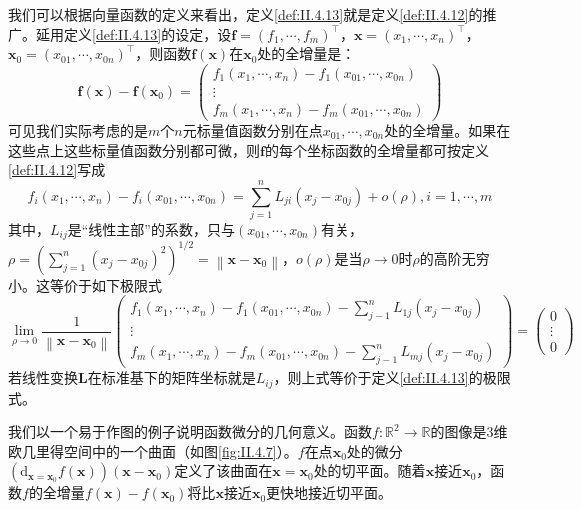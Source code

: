 \documentclass[main.tex]{subfiles}
\begin{document}
我们可以根据向量函数的定义来看出，定义\ref{def:II.4.13}就是定义\ref{def:II.4.12}的推广。延用定义\ref{def:II.4.13}的设定，设$\mathbf{f}=\left(f_1,\cdots,f_m\right)^\intercal$，$\mathbf{x}=\left(x_1,\cdots,x_n\right)^\intercal$，$\mathbf{x}_0=\left(x_{01},\cdots,x_{0n}\right)^\intercal$，则函数$\mathbf{f}\left(\mathbf{x}\right)$在$\mathbf{x}_0$处的全增量是：
\[
    \mathbf{f}\left(\mathbf{x}\right)-\mathbf{f}\left(\mathbf{x}_0\right)=\left(
    \begin{array}{c}
            f_1\left(x_1,\cdots,x_n\right)-f_1\left(x_{01},\cdots,x_{0n}\right) \\
            \vdots                                                              \\
            f_m\left(x_1,\cdots,x_n\right)-f_m\left(x_{01},\cdots,x_{0n}\right)
        \end{array}\right)
\]
可见我们实际考虑的是$m$个$n$元标量值函数分别在点$x_{01},\cdots,x_{0n}$处的全增量。如果在这些点上这些标量值函数分别都可微，则$\mathbf{f}$的每个坐标函数的全增量都可按定义\ref{def:II.4.12}写成
\[
    f_i\left(x_1,\cdots,x_n\right)-f_i\left(x_{01},\cdots,x_{0n}\right)=\sum_{j=1}^n L_{ji}\left(x_j-x_{0j}\right)+o\left(\rho\right),i=1,\cdots,m
\]
其中，$L_{ij}$是“线性主部”的系数，只与$\left(x_{01},\cdots,x_{0n}\right)$有关，$\rho=\left(\sum_{j=1}^n\left(x_j-x_{0j}\right)^2\right)^{1/2}=\left\|\mathbf{x}-\mathbf{x}_0\right\|$，$o\left(\rho\right)$是当$\rho\to 0$时$\rho$的高阶无穷小。这等价于如下极限式
\[
    \lim_{\rho\to 0}\frac{1}{\left\|\mathbf{x}-\mathbf{x}_0\right\|}\left(\begin{array}{c}
            f_1\left(x_1,\cdots,x_n\right)-f_1\left(x_{01},\cdots,x_{0n}\right)-\sum_{j-1}^nL_{1j}\left(x_j-x_{0j}\right) \\
            \vdots                                                                                                        \\
            f_m\left(x_1,\cdots,x_n\right)-f_m\left(x_{01},\cdots,x_{0n}\right)-\sum_{j-1}^nL_{mj}\left(x_j-x_{0j}\right)
        \end{array}\right)=\left(\begin{array}{c}0\\\vdots\\0\end{array}\right)
\]
若线性变换$\mathbf{L}$在标准基下的矩阵坐标就是$L_{ij}$，则上式等价于定义\ref{def:II.4.13}的极限式。

我们以一个易于作图的例子说明函数微分的几何意义。函数$f:\mathbb{R}^2\rightarrow\mathbb{R}$的图像是3维欧几里得空间中的一个曲面（如图\ref{fig:II.4.7}）。$f$在点$\mathbf{x}_0$处的微分$\left(\mathrm{d}_{\mathbf{x}=\mathbf{x}_0}f\left(\mathbf{x}\right)\right)\left(\mathbf{x}-\mathbf{x}_0\right)$定义了该曲面在$\mathbf{x}=\mathbf{x}_0$处的切平面。随着$\mathbf{x}$接近$\mathbf{x}_0$，函数$f$的全增量$f\left(\mathbf{x}\right)-f\left(\mathbf{x}_0\right)$将比$\mathbf{x}$接近$\mathbf{x}_0$更快地接近切平面。
\end{document}
